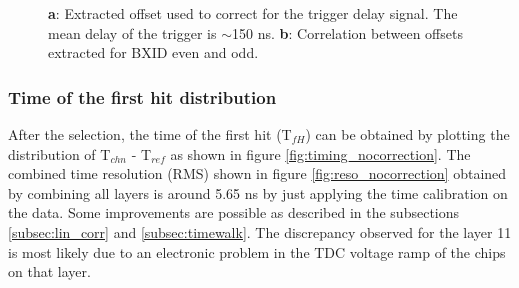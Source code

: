 \documentclass[twoside,a4paper,11pt]{article}
\begin{document}
\begin{figure}[htbp]
	\hfill
	\hfill
	\caption[]{\textbf{a}: Extracted offset used to correct for the trigger delay signal. The mean delay of the trigger is $\sim$150 ns. \textbf{b}: Correlation between offsets extracted for BXID even and odd.}
\end{figure}

\subsubsection{Time of the first hit distribution}
After the selection, the time of the first hit (T$_{fH}$) can be obtained by plotting the distribution of T$_{chn}$ - T$_{ref}$ as shown in figure \ref{fig:timing_nocorrection}. The combined time resolution (RMS) shown in figure \ref{fig:reso_nocorrection} obtained by combining all layers is around 5.65 ns by just applying the time calibration on the data. Some improvements are possible as described in the subsections \ref{subsec:lin_corr} and \ref{subsec:timewalk}. The discrepancy observed for the layer 11 is most likely due to an electronic problem in the TDC voltage ramp of the chips on that layer.
\end{document}
